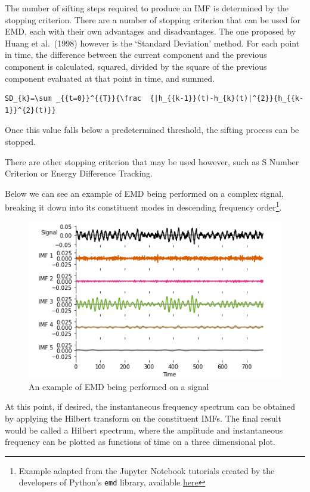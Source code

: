 \documentclass[
  english,
  paper=a4,
  oneside  ,captions=tableheading
]{scrbook}
\newcommand{\passthrough}[1]{#1}
\begin{document}
The number of sifting steps required to produce an IMF is determined by
the stopping criterion. There are a number of stopping criterion that
can be used for EMD, each with their own advantages and disadvantages.
The one proposed by Huang et al.~(1998) however is the `Standard
Deviation' method. For each point in time, the difference between the
current component and the previous component is calculated, squared,
divided by the square of the previous component evaluated at that point
in time, and summed.

\begin{lstlisting}
SD_{k}=\sum _{{t=0}}^{{T}}{\frac  {|h_{{k-1}}(t)-h_{k}(t)|^{2}}{h_{{k-1}}^{2}(t)}}
\end{lstlisting}

Once this value falls below a predetermined threshold, the sifting
process can be stopped.

There are other stopping criterion that may be used however, such as S
Number Criterion or Energy Difference Tracking.

Below we can see an example of EMD being performed on a complex signal,
breaking it down into its constituent modes in descending frequency
order\footnote{Example adapted from the Jupyter Notebook tutorials
  created by the developers of Python's \passthrough{\lstinline!emd!}
  library, available
  \href{https://emd.readthedocs.io/en/stable/_downloads/e47aacca40568b7bb056bd96535966c4/emd_tutorials_jupyter.zip}{here}}.

\begin{figure}
\centering
\includegraphics{img/emd_example.png}
\caption{An example of EMD being performed on a signal}
\end{figure}

At this point, if desired, the instantaneous frequency spectrum can be
obtained by applying the Hilbert transform on the constituent IMFs. The
final result would be called a Hilbert spectrum, where the amplitude and
instantaneous frequency can be plotted as functions of time on a three
dimensional plot.
\end{document}

